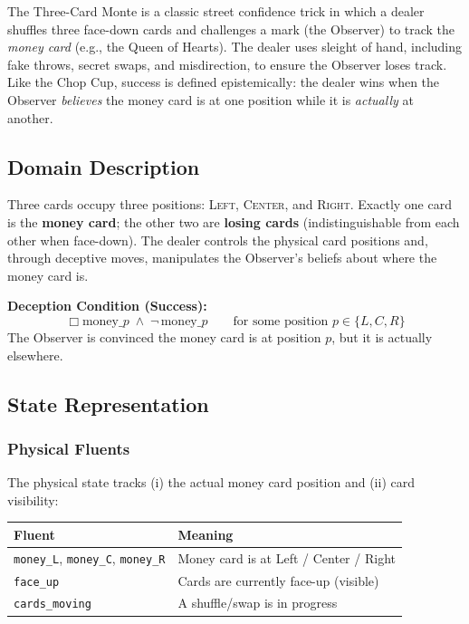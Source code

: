 \documentclass[11pt]{article}
\newcommand{\IBel}[1]{\ensuremath{\Box #1}}   %
\begin{document}
The Three-Card Monte is a classic street confidence trick in which a dealer shuffles three face-down cards and challenges a mark (the Observer) to track the \emph{money card} (e.g., the Queen of Hearts).
The dealer uses sleight of hand, including fake throws, secret swaps, and misdirection, to ensure the Observer loses track.
Like the Chop Cup, success is defined epistemically: the dealer wins when the Observer \emph{believes} the money card is at one position while it is \emph{actually} at another.

\subsection{Domain Description}

Three cards occupy three positions: \textsc{Left}, \textsc{Center}, and \textsc{Right}.
Exactly one card is the \textbf{money card}; the other two are \textbf{losing cards} (indistinguishable from each other when face-down).
The dealer controls the physical card positions and, through deceptive moves, manipulates the Observer's beliefs about where the money card is.

\textbf{Deception Condition (Success):}
\[
    \IBel{\text{money}\_p} \;\land\; \neg\,\text{money}\_p
    \qquad \text{for some position } p \in \{L, C, R\}
\]
The Observer is convinced the money card is at position $p$, but it is actually elsewhere.

\subsection{State Representation}

\subsubsection{Physical Fluents}

The physical state tracks (i) the actual money card position and (ii) card visibility:

\begin{center}
\begin{tabular}{ll}
\toprule
\textbf{Fluent} & \textbf{Meaning} \\
\midrule
\texttt{money\_L}, \texttt{money\_C}, \texttt{money\_R} & Money card is at Left / Center / Right \\
\texttt{face\_up} & Cards are currently face-up (visible) \\
\texttt{cards\_moving} & A shuffle/swap is in progress \\
\bottomrule
\end{tabular}
\end{center}
\end{document}
